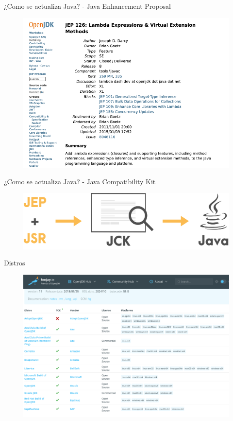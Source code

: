 \documentclass[aspectratio=169]{beamer}
\begin{document}
\begin{frame}[fragile]{¿Como se actualiza Java? - Java Enhancement Proposal}
	\begin{figure}
		\centering
		\includegraphics[width=0.9\linewidth]{Images/jep}
	\end{figure}
	
\end{frame}

\begin{frame}[fragile]{¿Como se actualiza Java? - Java Compatibility Kit}
	\begin{figure}
		\centering
		\includegraphics[width=0.9\linewidth]{Images/jck}
	\end{figure}
	
\end{frame}

\begin{frame}[fragile]{Distros}

\begin{figure}
\centering
\includegraphics[width=0.7\linewidth]{Images/foojay.png}
\end{figure}


\end{frame}
\end{document}
